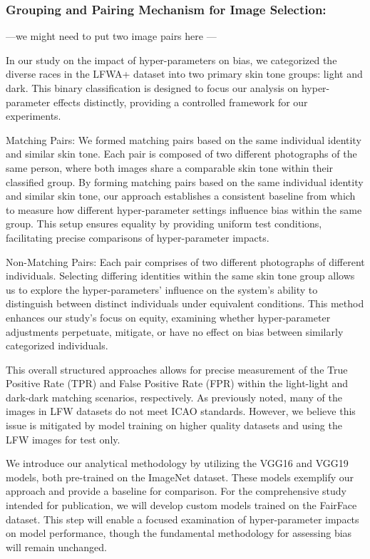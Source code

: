 \documentclass[conference]{IEEEtran}
\begin{document}
\subsubsection{
Grouping and Pairing Mechanism for Image Selection:}
---we might need to put two image pairs here ---

In our study on the impact of hyper-parameters on bias, we categorized the diverse races in the LFWA+ dataset into two primary skin tone groups: light and dark. This binary classification is designed to focus our analysis on hyper-parameter effects distinctly, providing a controlled framework for our experiments.\cite{liu2015faceattributes}

Matching Pairs: We formed matching pairs based on the same individual identity and similar skin tone. Each pair is composed of two different photographs of the same person, where both images share a comparable skin tone within their classified group. By forming matching pairs based on the same individual identity and similar skin tone, our approach establishes a consistent baseline from which to measure how different hyper-parameter settings influence bias within the same group. This setup ensures equality by providing uniform test conditions, facilitating precise comparisons of hyper-parameter impacts.

Non-Matching Pairs: Each pair comprises of two different photographs of different individuals. Selecting differing identities within the same skin tone group allows us to explore the hyper-parameters' influence on the system’s ability to distinguish between distinct individuals under equivalent conditions. This method enhances our study’s focus on equity, examining whether hyper-parameter adjustments perpetuate, mitigate, or have no effect on bias between similarly categorized individuals.

This overall structured approaches allows for precise measurement of the True Positive Rate (TPR) and False Positive Rate (FPR) within the light-light and dark-dark matching scenarios, respectively. As previously noted, many of the images in LFW datasets do not meet ICAO standards. However, we believe this issue is mitigated by model training on higher quality datasets and using the LFW images for test only.

We introduce our analytical methodology by utilizing the VGG16 and VGG19 models, both pre-trained on the ImageNet\cite{deng2009imagenet} dataset. These models exemplify our approach and provide a baseline for comparison. For the comprehensive study intended for publication, we will develop custom models trained on the FairFace dataset\cite{karkkainen2021fairface}. This step will enable a focused examination of hyper-parameter impacts on model performance, though the fundamental methodology for assessing bias will remain unchanged.
\end{document}
